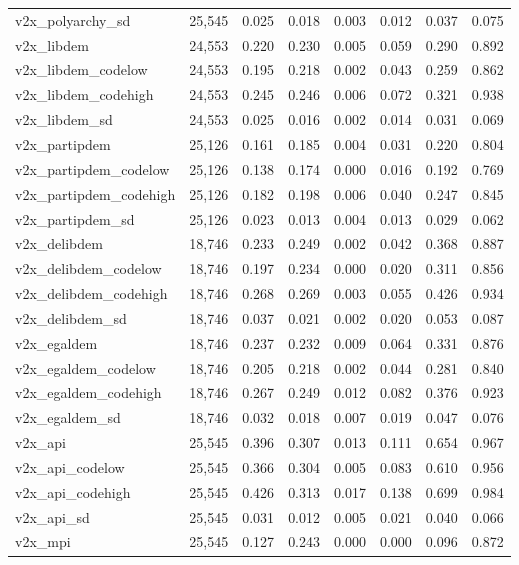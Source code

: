 \begin{table}[!htbp]
\begin{tabular}{@{\extracolsep{5pt}}lccccccc}
v2x\_polyarchy\_sd & 25,545 & 0.025 & 0.018 & 0.003 & 0.012 & 0.037 & 0.075 \\ 
v2x\_libdem & 24,553 & 0.220 & 0.230 & 0.005 & 0.059 & 0.290 & 0.892 \\ 
v2x\_libdem\_codelow & 24,553 & 0.195 & 0.218 & 0.002 & 0.043 & 0.259 & 0.862 \\ 
v2x\_libdem\_codehigh & 24,553 & 0.245 & 0.246 & 0.006 & 0.072 & 0.321 & 0.938 \\ 
v2x\_libdem\_sd & 24,553 & 0.025 & 0.016 & 0.002 & 0.014 & 0.031 & 0.069 \\ 
v2x\_partipdem & 25,126 & 0.161 & 0.185 & 0.004 & 0.031 & 0.220 & 0.804 \\ 
v2x\_partipdem\_codelow & 25,126 & 0.138 & 0.174 & 0.000 & 0.016 & 0.192 & 0.769 \\ 
v2x\_partipdem\_codehigh & 25,126 & 0.182 & 0.198 & 0.006 & 0.040 & 0.247 & 0.845 \\ 
v2x\_partipdem\_sd & 25,126 & 0.023 & 0.013 & 0.004 & 0.013 & 0.029 & 0.062 \\ 
v2x\_delibdem & 18,746 & 0.233 & 0.249 & 0.002 & 0.042 & 0.368 & 0.887 \\ 
v2x\_delibdem\_codelow & 18,746 & 0.197 & 0.234 & 0.000 & 0.020 & 0.311 & 0.856 \\ 
v2x\_delibdem\_codehigh & 18,746 & 0.268 & 0.269 & 0.003 & 0.055 & 0.426 & 0.934 \\ 
v2x\_delibdem\_sd & 18,746 & 0.037 & 0.021 & 0.002 & 0.020 & 0.053 & 0.087 \\ 
v2x\_egaldem & 18,746 & 0.237 & 0.232 & 0.009 & 0.064 & 0.331 & 0.876 \\ 
v2x\_egaldem\_codelow & 18,746 & 0.205 & 0.218 & 0.002 & 0.044 & 0.281 & 0.840 \\ 
v2x\_egaldem\_codehigh & 18,746 & 0.267 & 0.249 & 0.012 & 0.082 & 0.376 & 0.923 \\ 
v2x\_egaldem\_sd & 18,746 & 0.032 & 0.018 & 0.007 & 0.019 & 0.047 & 0.076 \\ 
v2x\_api & 25,545 & 0.396 & 0.307 & 0.013 & 0.111 & 0.654 & 0.967 \\ 
v2x\_api\_codelow & 25,545 & 0.366 & 0.304 & 0.005 & 0.083 & 0.610 & 0.956 \\ 
v2x\_api\_codehigh & 25,545 & 0.426 & 0.313 & 0.017 & 0.138 & 0.699 & 0.984 \\ 
v2x\_api\_sd & 25,545 & 0.031 & 0.012 & 0.005 & 0.021 & 0.040 & 0.066 \\ 
v2x\_mpi & 25,545 & 0.127 & 0.243 & 0.000 & 0.000 & 0.096 & 0.872 \\ 

\end{tabular}
\end{table}
